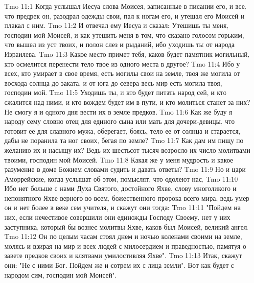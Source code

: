 \vs Tmo 11:1
Когда услышал Иесуа слова Моисея, записанные в писании его, и все, что предрек он, разодрал одежды свои, пал к ногам его, и утешал его Моисей и плакал с ним.
\vs Tmo 11:2
И отвечал ему Иесуа и сказал: Утешишь ты меня, господин мой Моисей, и как утешить меня в том, что сказано голосом горьким, что вышел из уст твоих, и полон слез и рыданий, ибо уходишь ты от народа Израилева.
\vs Tmo 11:3
Какое место примет тебя, каков будет памятник могильный, кто осмелится перенести тело твое из одного места в другое?
\vs Tmo 11:4
Ибо у всех, кто умирает в свое время, есть могилы свои на земле, твоя же могила от восхода солнца до заката, и от юга до севера весь мир есть могила твоя, господин мой.
\vs Tmo 11:5
Уходишь ты, и кто будет питать народ сей, и кто сжалится над ними, и кто вождем будет им в пути, и кто молиться станет за них? Не смогу я и одного дня вести их в земле предков.
\vs Tmo 11:6
Как же буду я народу сему словно отец для единого сына или мать для дочери-девицы, что готовит ее для славного мужа, оберегает, боясь, тело ее от солнца и старается, дабы не поранила та ног своих, бегая по земле?
\vs Tmo 11:7
Как дам им пищу по желанию их и насыщу их? Ведь их шестьсот тысяч возросло их число молитвами твоими, господин мой Моисей.
\vs Tmo 11:8
Какая же у меня мудрость и какое разумение в доме Божием словами судить и давать ответы?
\vs Tmo 11:9
Но и цари Аморрейские, когда услышат об этом, помыслят, что одолеют нас,
\vs Tmo 11:10
Ибо нет больше с нами Духа Святого, достойного Яхве, слову многоликого и непонятного Яхве верного во всем, божественного пророка всего мира, ведь умер он и нет более в веке сем учителя, и скажут они тогда:
\vs Tmo 11:11
"Пойдем на них, если нечестивое совершили они единожды Господу Своему, нет у них заступника, который бы вознес молитвы Яхве, каков был Моисей, великий ангел.
\vs Tmo 11:12
Он по целым часам стоял днем и ночью коленами своими на земле, молясь и взирая на мир и всех людей с милосердием и праведностью, памятуя о завете предков своих и клятвами умилостивляя Яхве".
\vs Tmo 11:13
Итак, скажут они: "Не с ними Бог. Пойдем же и сотрем их с лица земли". Вот как будет с народом сим, господин мой Моисей".

